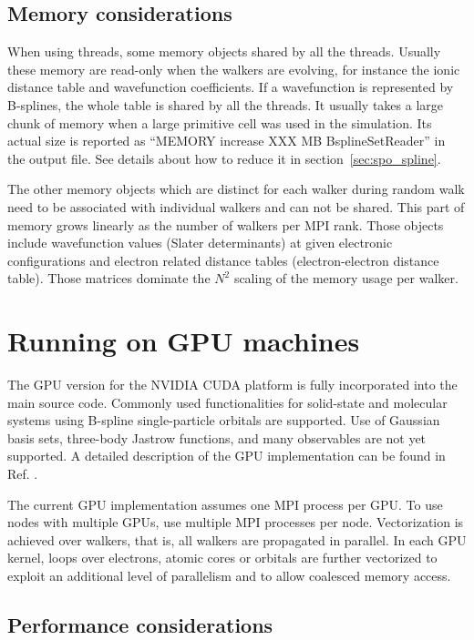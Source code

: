 \subsection{Memory considerations}
When using threads, some memory objects shared by all the threads. Usually these memory are read-only when the walkers are evolving, for instance the ionic distance table and wavefunction coefficients.
If a wavefunction is represented by B-splines, the whole table is shared by all the threads. It usually takes a large chunk of memory when a large primitive cell was used in the simulation. Its actual size is reported as ``MEMORY increase XXX MB BsplineSetReader'' in the output file.
See details about how to reduce it in section~\ref{sec:spo_spline}.

The other memory objects which are distinct for each walker during random walk need to be associated with individual walkers and can not be shared. This part of memory grows linearly as the number of walkers per MPI rank. Those objects include wavefunction values (Slater determinants) at given electronic configurations and electron related distance tables (electron-electron distance table). Those matrices dominate the $N^2$ scaling of the memory usage per walker.

\section{Running on GPU machines}
\label{sec:gpurunning}

The GPU version for the NVIDIA CUDA platform is fully incorporated into
the main source code. Commonly used functionalities for
solid-state and molecular systems using B-spline single-particle
orbitals are supported. Use of Gaussian basis sets, three-body
Jastrow functions, and many observables are not yet supported. A detailed description of the GPU
implementation can be found in Ref. \cite{EslerKimCeperleyShulenburger2012}.

The current GPU implementation assumes one MPI process per GPU. To use
nodes with multiple GPUs, use multiple MPI processes per node.
Vectorization is achieved over walkers, that is, all walkers are
propagated in parallel. In each GPU kernel, loops over electrons,
atomic cores or orbitals are further vectorized to exploit an
additional level of parallelism and to allow coalesced memory access.


\subsection{Performance considerations}
\label{sec:gpu:performance}

